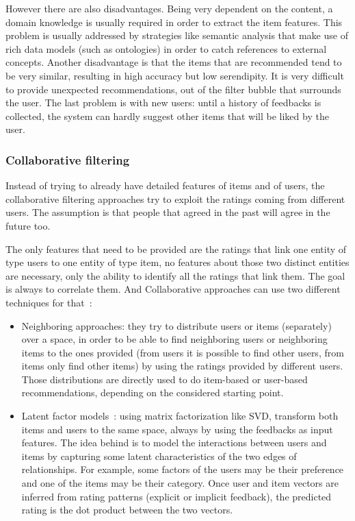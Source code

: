 However there are also disadvantages. Being very dependent on the content, a domain knowledge is usually required in order to extract the item features. This problem is usually addressed by strategies like semantic analysis that make use of rich data models (such as ontologies) in order to catch references to external concepts. Another disadvantage is that the items that are recommended tend to be very similar, resulting in high accuracy but low serendipity. It is very difficult to provide unexpected recommendations, out of the filter bubble that surrounds the user. The last problem is with new users: until a history of feedbacks is collected, the system can hardly suggest other items that will be liked by the user.

\subsubsection{Collaborative filtering}
Instead of trying to already have detailed features of items and of users, the collaborative filtering approaches try to exploit the ratings coming from different users. The assumption is that people that agreed in the past will agree in the future too.

The only features that need to be provided are the ratings that link one entity of type users to one entity of type item, no features about those two distinct entities are necessary, only the ability to identify all the ratings that link them. The goal is always to correlate them. And Collaborative approaches can use two different techniques for that~\cite{koren2015advances}:

\begin{itemize}
	\item Neighboring approaches: they try to distribute users or items (separately) over a space, in order to be able to find neighboring users or neighboring items to the ones provided (from users it is possible to find other users, from items only find other items) by using the ratings provided by different users. Those distributions are directly used to do item-based or user-based recommendations, depending on the considered starting point.

	\item Latent factor models~\cite{koren2009matrix}: using matrix factorization like SVD, transform both items and users to the same space, always by using the feedbacks as input features. The idea behind is to model the interactions between users and items by capturing some latent characteristics of the two edges of relationships. For example, some factors of the users may be their preference and one of the items may be their category. Once user and item vectors are inferred from rating patterns (explicit or implicit feedback), the predicted rating is the dot product between the two vectors.
\end{itemize}


